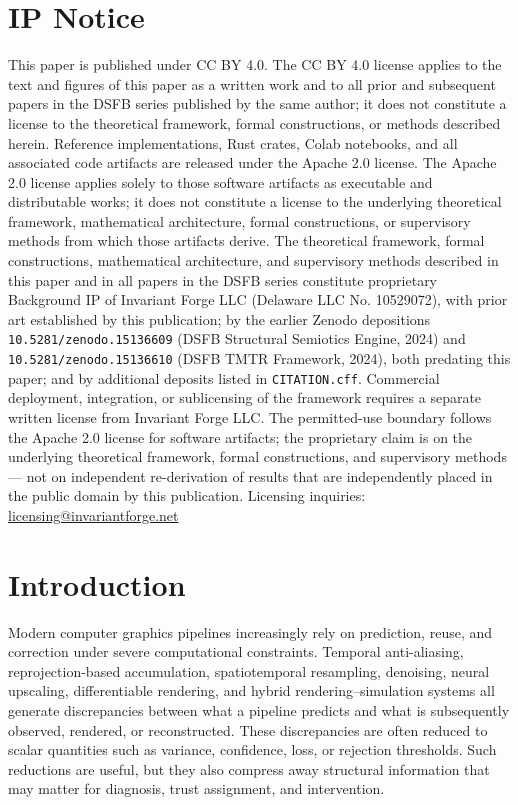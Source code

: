 \documentclass[11pt,letterpaper]{article}
\theoremstyle{gcresult}
\theoremstyle{definition}
\begin{document}
\section{IP Notice}
\label{sec:ip}
This paper is published under CC BY 4.0. The CC BY 4.0 license applies to the text and figures of this paper as a written work and to all prior and subsequent papers in the DSFB series published by the same author; it does not constitute a license to the theoretical framework, formal constructions, or methods described herein.
Reference implementations, Rust crates, Colab notebooks, and all associated code artifacts are released under the Apache 2.0 license. The Apache 2.0 license applies solely to those software artifacts as executable and distributable works; it does not constitute a license to the underlying theoretical framework, mathematical architecture, formal constructions, or supervisory methods from which those artifacts derive.
The theoretical framework, formal constructions, mathematical architecture, and supervisory methods described in this paper and in all papers in the DSFB series constitute proprietary Background IP of Invariant Forge LLC (Delaware LLC No. 10529072), with prior art established by this publication; by the earlier Zenodo depositions \texttt{10.5281/zenodo.15136609} (DSFB Structural Semiotics Engine, 2024) and \texttt{10.5281/zenodo.15136610} (DSFB TMTR Framework, 2024), both predating this paper; and by additional deposits listed in \texttt{CITATION.cff}. Commercial deployment, integration, or sublicensing of the framework requires a separate written license from Invariant Forge LLC. The permitted-use boundary follows the Apache 2.0 license for software artifacts; the proprietary claim is on the underlying theoretical framework, formal constructions, and supervisory methods — not on independent re-derivation of results that are independently placed in the public domain by this publication.
Licensing inquiries: \href{mailto:licensing@invariantforge.net}{licensing@invariantforge.net}
\tableofcontents
\clearpage


\section{Introduction}

Modern computer graphics pipelines increasingly rely on prediction, reuse, and correction under severe computational constraints. Temporal anti-aliasing, reprojection-based accumulation, spatiotemporal resampling, denoising, neural upscaling, differentiable rendering, and hybrid rendering--simulation systems all generate discrepancies between what a pipeline predicts and what is subsequently observed, rendered, or reconstructed. These discrepancies are often reduced to scalar quantities such as variance, confidence, loss, or rejection thresholds. Such reductions are useful, but they also compress away structural information that may matter for diagnosis, trust assignment, and intervention.
\end{document}
